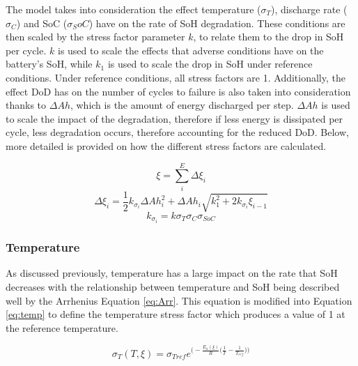 \documentclass[a4paper, 10pt]{article}
\numberwithin{equation}{section}
\begin{document}
The model takes into consideration the effect temperature ($\sigma_T$), discharge rate ($\sigma_C$) and SoC ($\sigma_SoC$) have on the rate of SoH degradation. These conditions are then scaled by the stress factor parameter $k$, to relate them to the drop in SoH per cycle. $k$ is used to scale the effects that adverse conditions have on the battery's SoH, while $k_1$ is used to scale the drop in SoH under reference conditions. Under reference conditions, all stress factors are 1. Additionally, the effect DoD has on the number of cycles to failure is also taken into consideration thanks to $\Delta Ah$, which is the amount of energy discharged per step. $\Delta Ah$ is used to scale the impact of the degradation, therefore if less energy is dissipated per cycle, less degradation occurs, therefore accounting for the reduced DoD. Below, more detailed is provided on how the different stress factors are calculated.

\begin{equation}
\label{eq:SoH}
    \xi=\sum_{i}^{E}\Delta\xi_i
\end{equation}
\begin{equation}
\label{eq:SoHstep}
    \Delta\xi_i=\frac{1}{2}k_{\sigma_i}\Delta Ah_i^2+\Delta Ah_i\sqrt{k_1^2+2k_{\sigma_i}\xi_{i-1}}
\end{equation}
\begin{equation}
    k_{\sigma_i}=k\sigma_T\sigma_C\sigma_{SoC}
\end{equation}

\subsubsection*{Temperature}
As discussed previously, temperature has a large impact on the rate that SoH decreases with the relationship between temperature and SoH being described well by the Arrhenius Equation \ref{eq:Arr}. This equation is modified into Equation \ref{eq:temp} to define the temperature stress factor which produces a value of 1 at the reference temperature.

\begin{equation}
\label{eq:temp}
    \sigma_T(T,\xi)=\sigma_{Tref}e^{\bigg(-\frac{E_a(\xi)}{R}\big(\frac{1}{T}-\frac{1}{T_{ref}}\big)\bigg)}
\end{equation}
\end{document}
